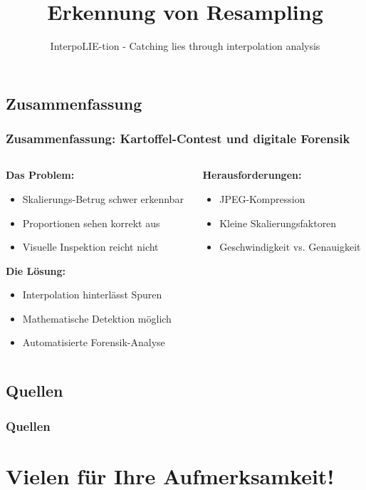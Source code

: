 \documentclass[11pt,t,usepdftitle=false,aspectratio=169]{beamer}
\begin{document}
\subsection{Zusammenfassung}

\begin{frame}
	\frametitle{Zusammenfassung: Kartoffel-Contest und digitale Forensik}
	\begin{columns}[T]
		\begin{column}{0.48\textwidth}
			\textbf{Das Problem:}
			\begin{itemize}
				\item Skalierungs-Betrug schwer erkennbar
				\item Proportionen sehen korrekt aus
				\item Visuelle Inspektion reicht nicht
			\end{itemize}
			
			\vspace{1em}
			\textbf{Die Lösung:}
			\begin{itemize}
				\item Interpolation hinterlässt Spuren
				\item Mathematische Detektion möglich
				\item Automatisierte Forensik-Analyse
			\end{itemize}
		\end{column}
		\begin{column}{0.48\textwidth}
			\textbf{Herausforderungen:}
			\begin{itemize}
				\item JPEG-Kompression
				\item Kleine Skalierungsfaktoren
				\item Geschwindigkeit vs. Genauigkeit
			\end{itemize}
		\end{column}
	\end{columns}
\end{frame}

\subsection{Quellen}
\begin{frame}
    \frametitle{Quellen}
    \begingroup
    \setlength{\bibitemsep}{2pt}
    \setlength{\itemsep}{0pt}
    \setlength{\parskip}{0pt}
    \renewcommand{\bibfont}{\tiny}
    \printbibliography[heading=none]
    \endgroup
\end{frame}

\title[Erkennung von Resampling]{Erkennung von Resampling}
\subtitle{InterpoLIE-tion - Catching lies through interpolation analysis}
\section{Vielen für Ihre Aufmerksamkeit!}
\end{document}
